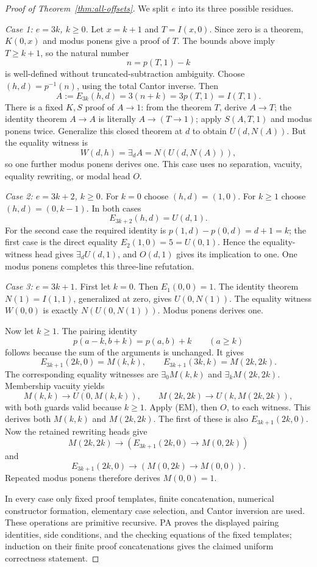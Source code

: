 \begin{proof}[Proof of Theorem~\ref{thm:all-offsets}]
We split $e$ into its three possible residues.

\emph{Case 1: $e=3k$, $k\ge0$.}
Let $x=k+1$ and $T=I(x,0)$. Since zero is a theorem, $K(0,x)$ and
modus ponens give a proof of $T$. The bounds above imply $T\ge k+1$,
so the natural number
\[
 n=p(T,1)-k
\]
is well-defined without truncated-subtraction ambiguity. Choose
$(h,d)=p^{-1}(n)$, using the total Cantor inverse. Then
\[
 A:=E_{3k}(h,d)=3(n+k)=3p(T,1)=I(T,1).
\]
There is a fixed $K,S$ proof of $A\to1$: from the theorem $T$, derive
$A\to T$; the identity theorem $A\to A$ is literally
$A\to(T\to1)$; apply $S(A,T,1)$ and modus ponens twice. Generalize
this closed theorem at $d$ to obtain $U(d,N(A))$. But the equality
witness is
\[
 W(d,h)=\exists_d A=N(U(d,N(A))),
\]
so one further modus ponens derives one. This case uses no separation,
vacuity, equality rewriting, or modal head $O$.

\emph{Case 2: $e=3k+2$, $k\ge0$.}
For $k=0$ choose $(h,d)=(1,0)$. For $k\ge1$ choose
$(h,d)=(0,k-1)$. In both cases
\[
 E_{3k+2}(h,d)=U(d,1).
\]
For the second case the required identity is
$p(1,d)-p(0,d)=d+1=k$; the first case is the direct equality
$E_2(1,0)=5=U(0,1)$. Hence the equality-witness head gives
$\exists_d U(d,1)$, and $O(d,1)$ gives its implication to one.
One modus ponens completes this three-line refutation.

\emph{Case 3: $e=3k+1$.}
First let $k=0$. Then $E_1(0,0)=1$. The identity theorem
$N(1)=I(1,1)$, generalized at zero, gives $U(0,N(1))$.
The equality witness $W(0,0)$ is exactly $N(U(0,N(1)))$.
Modus ponens derives one.

Now let $k\ge1$. The pairing identity
\[
 p(a-k,b+k)=p(a,b)+k\qquad(a\ge k)
\]
follows because the sum of the arguments is unchanged. It gives
\[
 E_{3k+1}(2k,0)=M(k,k),\qquad
 E_{3k+1}(3k,k)=M(2k,2k).
\]
The corresponding equality witnesses are
$\exists_0 M(k,k)$ and $\exists_k M(2k,2k)$. Membership vacuity yields
\[
 M(k,k)\to U(0,M(k,k)),\qquad
 M(2k,2k)\to U(k,M(2k,2k)),
\]
with both guards valid because $k\ge1$. Apply (EM), then $O$, to each
witness. This derives both $M(k,k)$ and $M(2k,2k)$. The first of these
is also $E_{3k+1}(2k,0)$. Now the retained rewriting heads give
\[
 M(2k,2k)\to(E_{3k+1}(2k,0)\to M(0,2k))
\]
and
\[
 E_{3k+1}(2k,0)\to(M(0,2k)\to M(0,0)).
\]
Repeated modus ponens therefore derives $M(0,0)=1$.

In every case only fixed proof templates, finite concatenation, numerical
constructor formation, elementary case selection, and Cantor inversion
are used. These operations are primitive recursive. PA proves the displayed
pairing identities, side conditions, and the checking equations of the
fixed templates; induction on their finite proof concatenations gives the
claimed uniform correctness statement.
\end{proof}

